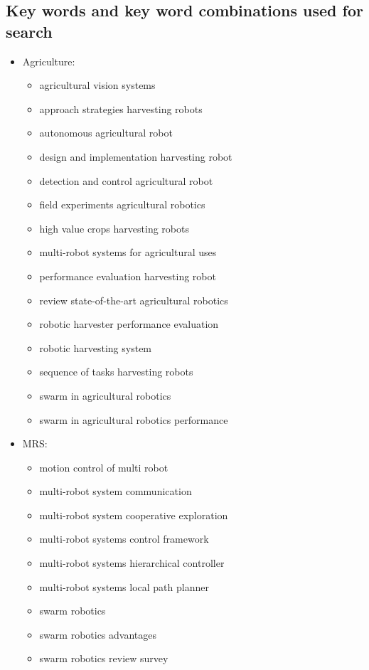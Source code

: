     \subsection{Key words and key word combinations used for search}
    \begin{itemize}
        \item Agriculture: \ \begin{itemize}
            \item agricultural vision systems
            \item approach strategies harvesting robots
            \item autonomous agricultural robot
            \item design and implementation harvesting robot
            \item detection and control agricultural robot
            \item field experiments agricultural robotics
            \item high value crops harvesting robots
            \item multi-robot systems for agricultural uses
            \item performance evaluation harvesting robot        
            \item review state-of-the-art agricultural robotics
            \item robotic harvester performance evaluation
            \item robotic harvesting system
            \item sequence of tasks harvesting robots
            \item swarm in agricultural robotics
            \item swarm in agricultural robotics performance
        \end{itemize}
        \item MRS: \ \begin{itemize}
            \item motion control of multi robot
            \item multi-robot system  communication
            \item multi-robot system cooperative exploration
            \item multi-robot systems control framework
            \item multi-robot systems hierarchical controller
            \item multi-robot systems local path planner
            \item swarm robotics
            \item swarm robotics advantages
            \item swarm robotics review survey
        \end{itemize}
        
    \end{itemize}
